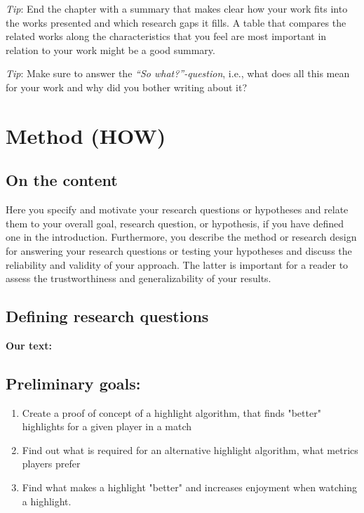 \documentclass[a4paper,twoside]{bth}
\begin{document}
\emph{Tip}: End the chapter with a summary that makes clear how your work fits into the works presented and which research gaps it fills. A table that compares the related works along the characteristics that you feel are most important in relation to your work might be a good summary.
    
\emph{Tip}: Make sure to answer the \emph{``So what?''-question}, i.e., what does all this mean for your work and why did you bother writing about it?


\chapter{Method (HOW)}
\label{chp:method}
\section{On the content}
Here you specify and motivate your research questions or hypotheses and relate them to your overall goal, research question, or hypothesis, if you have defined one in the introduction. Furthermore, you describe the method or research design for answering your research questions or testing your hypotheses and discuss the reliability and validity of your approach. The latter is important for a reader to assess the trustworthiness and generalizability of your results.  


\section{Defining research questions}
\textbf{Our text:}\\
\section{Preliminary goals:}
\normalsize
\begin{enumerate}[label=PG\arabic*., leftmargin=*]
    \item Create a proof of concept of a highlight algorithm, that finds "better" highlights for a given player in a match
    \item Find out what is required for an alternative highlight algorithm, what metrics players prefer
    \item Find what makes a highlight "better" and increases enjoyment when watching a highlight.
\end{enumerate}
\end{document}
